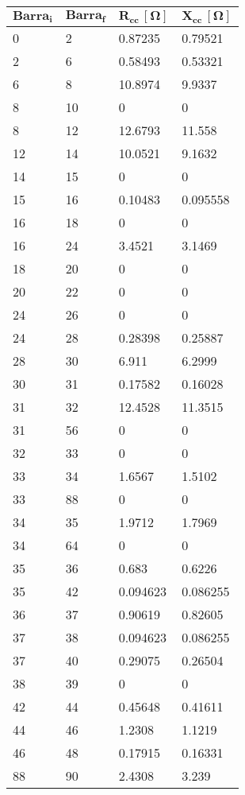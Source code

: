 \begin{tabular}{llll}
\toprule
\textbf{$\mathbf{Barra_i}$}&\textbf{$\mathbf{Barra_f}$}&\textbf{$\mathbf{R_{cc}\,[\Omega]}$}&\textbf{$\mathbf{X_{cc}\,[\Omega]}$}\\
\midrule
0&2&0.87235&0.79521\\
2&6&0.58493&0.53321\\
6&8&10.8974&9.9337\\
8&10&0&0\\
8&12&12.6793&11.558\\
12&14&10.0521&9.1632\\
14&15&0&0\\
15&16&0.10483&0.095558\\
16&18&0&0\\
16&24&3.4521&3.1469\\
18&20&0&0\\
20&22&0&0\\
24&26&0&0\\
24&28&0.28398&0.25887\\
28&30&6.911&6.2999\\
30&31&0.17582&0.16028\\
31&32&12.4528&11.3515\\
31&56&0&0\\
32&33&0&0\\
33&34&1.6567&1.5102\\
33&88&0&0\\
34&35&1.9712&1.7969\\
34&64&0&0\\
35&36&0.683&0.6226\\
35&42&0.094623&0.086255\\
36&37&0.90619&0.82605\\
37&38&0.094623&0.086255\\
37&40&0.29075&0.26504\\
38&39&0&0\\
42&44&0.45648&0.41611\\
44&46&1.2308&1.1219\\
46&48&0.17915&0.16331\\
88&90&2.4308&3.239\\
\bottomrule
\end{tabular}
